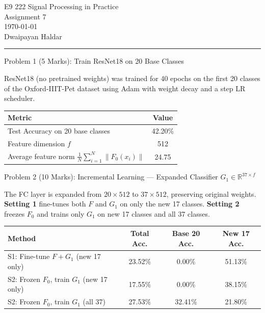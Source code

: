 \documentclass[11pt,a4paper,onecolumn]{exam}
\newcommand{\questionheader}[1]{%
  \begin{tcolorbox}[
    enhanced,
    colback=black,
    coltext=white,
    boxrule=0pt,
    fontupper=\bfseries,
    arc=3mm,
    top=1.5pt, bottom=1.5pt
  ]
  #1
  \end{tcolorbox}%
}
\begin{document}
\begingroup
    \centering
    \LARGE E9 222 Signal Processing in Practice\\
    \LARGE Assignment 7\\[0.5em]
    \large \today\\[0.5em]
    \large Dwaipayan Haldar\par
\endgroup
\noindent\rule{\textwidth}{0.5pt}
\printanswers
\renewcommand{\solutiontitle}{\noindent\textbf{Ans:}\enspace}
\setlength{\parskip}{1pt}

\questionheader{Problem 1 (5 Marks): Train ResNet18 on 20 Base Classes}

\noindent ResNet18 (no pretrained weights) was trained for 40 epochs on the first 20 classes of the Oxford-IIIT-Pet dataset using Adam with weight decay and a step LR scheduler.

\vspace{2pt}
\begin{center}
\begin{tabular}{lc}
\toprule
\textbf{Metric} & \textbf{Value} \\
\midrule
Test Accuracy on 20 base classes & 42.20\% \\
Feature dimension $f$ & 512 \\
Average feature norm $\frac{1}{N}\sum_{i=1}^{N}\|F_0(x_i)\|$ & 24.75 \\
\bottomrule
\end{tabular}
\end{center}

\questionheader{Problem 2 (10 Marks): Incremental Learning — Expanded Classifier $G_1 \in \mathbb{R}^{37 \times f}$}

\noindent The FC layer is expanded from $20\!\times\!512$ to $37\!\times\!512$, preserving original weights. \textbf{Setting 1} fine-tunes both $F$ and $G_1$ on only the new 17 classes. \textbf{Setting 2} freezes $F_0$ and trains only $G_1$ on new 17 classes and all 37 classes. 
\vspace{2pt}
\begin{center}
\begin{tabular}{lccc}
\toprule
\textbf{Method} & \textbf{Total Acc.} & \textbf{Base 20 Acc.} & \textbf{New 17 Acc.} \\
\midrule
S1: Fine-tune $F + G_1$ (new 17 only) & 23.52\% & 0.00\% & 51.13\% \\
S2: Frozen $F_0$, train $G_1$ (new 17 only) & 17.55\% & 0.00\% & 38.15\% \\
S2: Frozen $F_0$, train $G_1$ (all 37) & 27.53\% & 32.41\% & 21.80\% \\
\bottomrule
\end{tabular}
\end{center}
\end{document}
